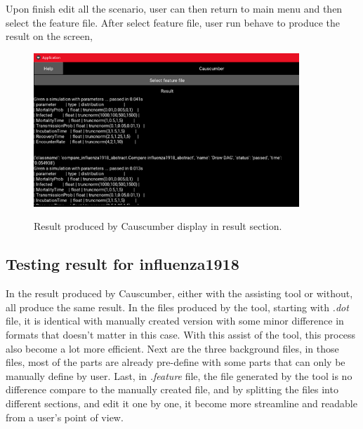 \noindent 
Upon finish edit all the scenario, user can then return to main menu and then select the feature file. After select feature file, user run behave to produce the result on the screen,
\begin{figure}[H]
	\centering
	\includegraphics[width=10cm]{figures/influenzaTestProcess15.png}\\
	\caption{Result produced by Causcumber display in result section.}
	\label{fig:figure33}
\end{figure}

\subsection{Testing result for influenza1918}
In the result produced by Causcumber, either with the assisting tool or without, all produce the same result. In the files produced by the tool, starting with \textsl{.dot} file, it is identical with manually created version with some minor difference in formats that doesn’t matter in this case. With this assist of the tool, this process also become a lot more efficient. Next are the three background files, in those files, most of the parts are already pre-define with some parts that can only be manually define by user. Last, in \textsl{.feature} file, the file generated by the tool is no difference compare to the manually created file, and by splitting the files into different sections, and edit it one by one, it become more streamline and readable from a user’s point of view. 
